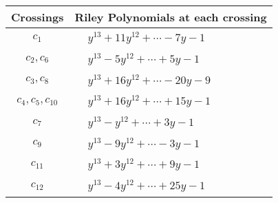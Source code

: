 \documentclass[1p]{elsarticle_modified}
\theoremstyle{definition}
\begin{document}
\begin{tabular}{m{50pt}|m{274pt}}
Crossings & \hspace{64pt}Riley Polynomials at each crossing \\
\hline $$\begin{aligned}c_{1}\end{aligned}$$&$\begin{aligned}
&y^{13}+11 y^{12}+\cdots-7 y-1
\end{aligned}$\\
\hline $$\begin{aligned}c_{2},c_{6}\end{aligned}$$&$\begin{aligned}
&y^{13}-5 y^{12}+\cdots+5 y-1
\end{aligned}$\\
\hline $$\begin{aligned}c_{3},c_{8}\end{aligned}$$&$\begin{aligned}
&y^{13}+16 y^{12}+\cdots-20 y-9
\end{aligned}$\\
\hline $$\begin{aligned}c_{4},c_{5},c_{10}\end{aligned}$$&$\begin{aligned}
&y^{13}+16 y^{12}+\cdots+15 y-1
\end{aligned}$\\
\hline $$\begin{aligned}c_{7}\end{aligned}$$&$\begin{aligned}
&y^{13}- y^{12}+\cdots+3 y-1
\end{aligned}$\\
\hline $$\begin{aligned}c_{9}\end{aligned}$$&$\begin{aligned}
&y^{13}-9 y^{12}+\cdots-3 y-1
\end{aligned}$\\
\hline $$\begin{aligned}c_{11}\end{aligned}$$&$\begin{aligned}
&y^{13}+3 y^{12}+\cdots+9 y-1
\end{aligned}$\\
\hline $$\begin{aligned}c_{12}\end{aligned}$$&$\begin{aligned}
&y^{13}-4 y^{12}+\cdots+25 y-1
\end{aligned}$\\
\hline
\end{tabular}\\~\\
\end{document}
